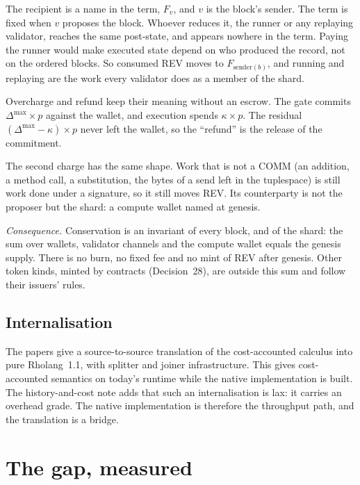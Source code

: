 \documentclass[11pt]{article}
\begin{document}
The recipient is a name in the term, $F_v$, and $v$ is the block's sender. The term is fixed when $v$ proposes the block. Whoever reduces it, the runner or any replaying validator, reaches the same post-state, and appears nowhere in the term. Paying the runner would make executed state depend on who produced the record, not on the ordered blocks. So consumed REV moves to $F_{\mathrm{sender}(b)}$, and running and replaying are the work every validator does as a member of the shard.

Overcharge and refund keep their meaning without an escrow. The gate commits $\Delta^{\max} \times p$ against the wallet, and execution spends $\kappa \times p$. The residual $(\Delta^{\max} - \kappa) \times p$ never left the wallet, so the ``refund'' is the release of the commitment.

The second charge has the same shape. Work that is not a COMM (an addition, a method call, a substitution, the bytes of a send left in the tuplespace) is still work done under a signature, so it still moves REV. Its counterparty is not the proposer but the shard: a compute wallet named at genesis.

\emph{Consequence.} Conservation is an invariant of every block, and of the shard: the sum over wallets, validator channels and the compute wallet equals the genesis supply. There is no burn, no fixed fee and no mint of REV after genesis. Other token kinds, minted by contracts (Decision~28), are outside this sum and follow their issuers' rules.

\subsection{Internalisation}

The papers give a source-to-source translation of the cost-accounted calculus into pure Rholang~1.1, with splitter and joiner infrastructure. This gives cost-accounted semantics on today's runtime while the native implementation is built. The history-and-cost note adds that such an internalisation is lax: it carries an overhead grade. The native implementation is therefore the throughput path, and the translation is a bridge.

\section{The gap, measured}\label{sec:measured}
\end{document}
